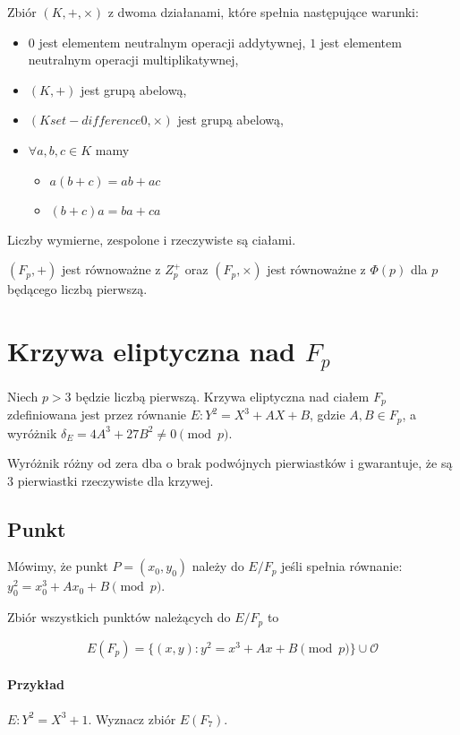 \documentclass{report}
\begin{document}
Zbiór $(K, +, \times)$ z dwoma działanami, które spełnia następujące warunki:
\begin{itemize}
\item $0$ jest elementem neutralnym operacji addytywnej, $1$ jest elementem neutralnym operacji multiplikatywnej,
\item $(K, +)$ jest grupą abelową,
\item $(K set-difference {0}, \times)$ jest grupą abelową,
\item $\forall a, b, c \in K$ mamy
	\begin{itemize}
		\item $a(b + c) = ab + ac$
		\item $(b + c)a = ba + ca$
	\end{itemize}
\end{itemize}

Liczby wymierne, zespolone i rzeczywiste są ciałami.

$(F_p, +)$ jest równoważne z $Z_p^+$ oraz $(F_p, \times)$ jest równoważne z $\Phi(p)$ dla $p$ będącego liczbą pierwszą.


\section{Krzywa eliptyczna nad $F_p$}

Niech $p > 3$ będzie liczbą pierwszą. Krzywa eliptyczna nad ciałem $F_p$ zdefiniowana jest przez równanie $E: Y^2 = X^3 + AX + B$, gdzie $A, B \in F_p$, a wyróżnik ${\delta}_E = 4A^3 + 27B^2 \neq 0 \pmod{p}$.

Wyróżnik różny od zera dba o brak podwójnych pierwiastków i gwarantuje, że są 3 pierwiastki rzeczywiste dla krzywej.

\subsection{Punkt}

Mówimy, że punkt $P = (x_0, y_0)$ należy do $E/F_p$ jeśli spełnia równanie: $y_0^2 = x_0^3 + Ax_0 + B \pmod{p}$.

Zbiór wszystkich punktów należących do $E/F_p$ to

$$
E(F_p) = \{(x, y) : y^2 = x^3 + Ax + B \pmod{p} \} \cup \mathcal{O}
$$

\paragraph{Przykład} $E : Y^2 = X^3 + 1$. Wyznacz zbiór $E(F_7)$.
\end{document}

